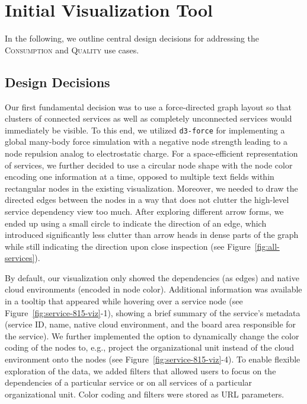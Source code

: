 \documentclass[conference]{IEEEtran}
\begin{document}
\section{Initial Visualization Tool}
\label{sec:visualization-initial}

In the following, we outline central design decisions for addressing the \textsc{Consumption} and \textsc{Quality} use cases.

\subsection{Design Decisions}

Our first fundamental decision was to use a force-directed graph layout so that clusters of connected services as well as completely unconnected services would immediately be visible.
To this end, we utilized \texttt{d3-force} %
for implementing a global many-body force simulation with a negative node strength leading to a node repulsion analog to electrostatic charge.
For a space-efficient representation of services, we further decided to use a circular node shape with the node color encoding one information at a time, opposed to multiple text fields within rectangular nodes in the existing visualization.
Moreover, we needed to draw the directed edges between the nodes in a way that does not clutter the high-level service dependency view too much.
After exploring different arrow forms, we ended up using a small circle to indicate the direction of an edge, which introduced significantly less clutter than arrow heads in dense parts of the graph while still indicating the direction upon close inspection (see Figure~\ref{fig:all-services}). 

By default, our visualization only showed the dependencies (as edges) and native cloud environments (encoded in node color).
Additional information was available in a tooltip that appeared while hovering over a service node (see Figure~\ref{fig:service-815-viz}-1), showing a brief summary of the service's metadata (service ID, name, native cloud environment, and the board area responsible for the service).
We further implemented the option to dynamically change the color coding of the nodes to, e.g., project the organizational unit instead of the cloud environment onto the nodes (see Figure~\ref{fig:service-815-viz}-4).
To enable flexible exploration of the data, we added filters that allowed users to focus on the dependencies of a particular service or on all services of a particular organizational unit.
Color coding and filters were stored as URL parameters. 
\end{document}
